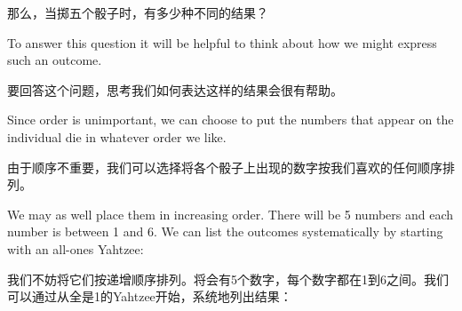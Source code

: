那么，当掷五个骰子时，有多少种不同的结果？

To answer this question it will
be helpful to think about how we might express such an outcome.

要回答这个问题，思考我们如何表达这样的结果会很有帮助。

Since order is unimportant, we can choose to put the numbers that appear
on the individual die in whatever order we like.

由于顺序不重要，我们可以选择将各个骰子上出现的数字按我们喜欢的任何顺序排列。

We may as well place them
in increasing order.  There will be 5 numbers and each number is between 1
and 6.  We can list the outcomes systematically by starting with an all-ones
Yahtzee:

我们不妨将它们按递增顺序排列。将会有5个数字，每个数字都在1到6之间。我们可以通过从全是1的Yahtzee开始，系统地列出结果：

